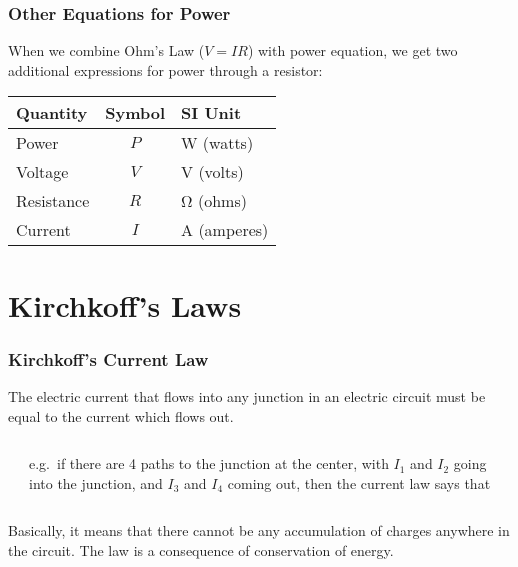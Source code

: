 \documentclass[12pt,aspectratio=169]{beamer}
\newcommand{\eq}[2]{\vspace{#1}{\Large\begin{displaymath}#2\end{displaymath}}}
\begin{document}
\begin{frame}
  \frametitle{Other Equations for Power}
  When we combine Ohm's Law ($V=IR$) with power equation, we get two additional
  expressions for power through a resistor:

  \eq{-.2in}{
    \boxed{P=\frac{V^2}{R}}\quad\boxed{P=I^2R}
  }
  
  \begin{center}
    \begin{tabular}{l|c|l}
      \rowcolor{pink}
      \textbf{Quantity} & \textbf{Symbol} & \textbf{SI Unit} \\ \hline
      Power      & $P$ & \si{\watt} (watts) \\
      Voltage    & $V$ & \si{\volt} (volts) \\
      Resistance & $R$ & \si{\ohm} (ohms) \\
      Current    & $I$ & \si{\ampere} (amperes) \\
    \end{tabular}
  \end{center}
\end{frame}


\section{Kirchkoff's Laws}

\begin{frame}
  \frametitle{Kirchkoff's Current Law}
  The electric current that flows into any junction in an electric circuit must
  be equal to the current which flows out.

  \vspace{.2in}
  \begin{columns}
    \begin{center}
    \end{center}
    e.g.\ if there are 4 paths to the junction at the center, with $I_1$ and
    $I_2$ going into the junction, and $I_3$ and $I_4$ coming out, then the
    current law says that

    \eq{-.3in}{I_1+I_2-I_3-I_4=0}
  \end{columns}

  \vspace{.2in}Basically, it means that there cannot be any accumulation of
  charges anywhere in the circuit. The law is a consequence of conservation of
  energy.
\end{frame}
\end{document}
